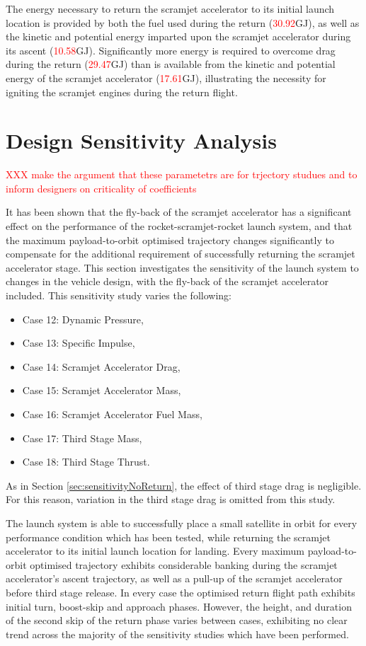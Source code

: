The energy necessary to return the scramjet accelerator to its initial launch location is provided by both the fuel used during the return (\textcolor{red}{30.92}GJ), as well as the kinetic and potential energy imparted upon the scramjet accelerator during its ascent (\textcolor{red}{10.58}GJ). Significantly more energy is required to overcome drag during the return (\textcolor{red}{29.47}GJ) than is available from the kinetic and potential energy of the scramjet accelerator (\textcolor{red}{17.61}GJ), illustrating the necessity for igniting the scramjet engines during the return flight. 





\section{Design Sensitivity Analysis}\label{sec:sensitivity}

\textcolor{red}{XXX make the argument that these parametetrs are for trjectory studues and to inform designers on criticality of coefficients}

It has been shown that the fly-back of the scramjet accelerator has a significant effect on the performance of the rocket-scramjet-rocket launch system, and that the maximum payload-to-orbit optimised trajectory changes significantly to compensate for the additional requirement of successfully returning the scramjet accelerator stage. This section investigates the sensitivity of the launch system to changes in the vehicle design, with the fly-back of the scramjet accelerator included. This sensitivity study varies the following:
\begin{itemize}
	\item Case 12: Dynamic Pressure, 
	\item Case 13: Specific Impulse,
	\item Case 14: Scramjet Accelerator Drag,
	\item Case 15: Scramjet Accelerator Mass,
	\item Case 16: Scramjet Accelerator Fuel Mass,
	\item Case 17: Third Stage Mass,
	\item Case 18: Third Stage Thrust.
\end{itemize}
As in Section \ref{sec:sensitivityNoReturn}, the effect of third stage drag is negligible. For this reason, variation in the third stage drag is omitted from this study. 

The launch system is able to successfully place a small satellite in orbit for every performance condition which has been tested, while returning the scramjet accelerator to its initial launch location for landing. 
Every maximum payload-to-orbit optimised trajectory exhibits considerable banking during the scramjet accelerator's ascent trajectory, as well as a pull-up of the scramjet accelerator before third stage release. 
In every case the optimised return flight path exhibits initial turn, boost-skip and approach phases. 
However, the height, and duration of the second skip of the return phase varies between cases, exhibiting no clear trend across the majority of the sensitivity studies which have been performed.

